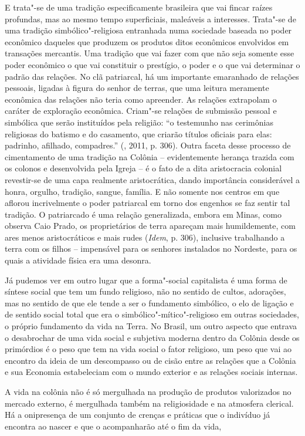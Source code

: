 {E trata"-se de uma tradição especificamente brasileira que vai fincar
raízes profundas, mas ao mesmo tempo superficiais, maleáveis a
interesses. Trata"-se de uma tradição simbólico"-religiosa entranhada numa
sociedade baseada no poder econômico daqueles que produzem os produtos
ditos econômicos envolvidos em transações mercantis. Uma tradição que
vai fazer com que não seja somente esse poder econômico o que vai
constituir o prestígio, o poder e o que vai determinar o padrão das
relações. No clã patriarcal, há um importante emaranhado de relações
pessoais, ligadas à figura do senhor de terras, que uma leitura
meramente econômica das relações não teria como apreender. As relações
extrapolam o caráter de exploração econômica. Criam"-se relações de
submissão pessoal e simbólica que serão instituídos pela religião: ``o
testemunho nas cerimônias religiosas do batismo e do casamento, que
criarão títulos oficiais para elas: padrinho, afilhado, compadres.''
(, 2011, p. 306). Outra faceta desse processo de cimentamento de
uma tradição na Colônia -- evidentemente herança trazida com os colonos
e desenvolvida pela Igreja -- é o fato de a dita aristocracia colonial
revestir-se de uma capa realmente aristocrática, dando importância considerável a
honra, orgulho, tradição, sangue, família. E não somente nos centros em
que aflorou incrivelmente o poder patriarcal em torno dos engenhos se
faz sentir tal tradição. O patriarcado é uma relação generalizada,
embora em Minas, como observa Caio Prado, os proprietários de terra
apareçam mais humildemente, com ares menos aristocráticos e mais rudes
(\emph{Idem}, p. 306), inclusive trabalhando a terra com os filhos --
impensável para os senhores instalados no Nordeste, para os quais a
atividade física era uma desonra.

Já pudemos ver em outro lugar que a forma"-social capitalista é uma
forma de síntese social que tem um fundo religioso, não no sentido de
cultos, adorações, mas no sentido de que ele tende a ser o fundamento
simbólico, o elo de ligação e de sentido social total que era o
simbólico"-mítico"-religioso em outras sociedades, o próprio fundamento da
vida na Terra. No Brasil, um outro aspecto que entrava o desabrochar de
uma vida social e subjetiva moderna dentro da Colônia desde os primórdios
é o peso que tem na vida social o fator religioso, um peso que vai ao
encontro da ideia de um descompasso ou de cisão entre as relações que
a Colônia e sua Economia estabeleciam com o mundo exterior e as relações
sociais internas.

A vida na colônia não é só mergulhada na produção de produtos
valorizados no mercado externo, é mergulhada também na religiosidade e
na atmosfera clerical. Há a onipresença de um conjunto de crenças e
práticas que o indivíduo já encontra ao nascer e que o acompanharão até
o fim da vida,

}
